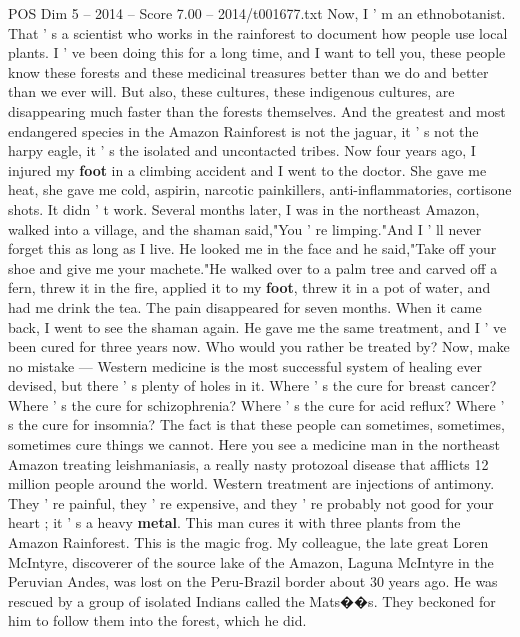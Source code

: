 \begin{textsample}{POS Dim 5 – 2014 – Score 7.00 – 2014/t001677.txt}  \label{ex:f5_pos_043}
Now, I ' m an ethnobotanist.
That ' s a scientist who works in the rainforest to document how people use local plants.
I ' ve been doing this for a long time, and I want to tell you, these people know these forests and these medicinal treasures better than we do and better than we ever will.
But also, these cultures, these indigenous cultures, are disappearing much faster than the forests themselves.
And the greatest and most endangered species in the Amazon Rainforest is not the jaguar, it ' s not the harpy eagle, it ' s the isolated and uncontacted tribes.
Now four years ago, I injured my \textbf{foot} in a climbing accident and I went to the doctor.
She gave me heat, she gave me cold, aspirin, narcotic painkillers, anti-inflammatories, cortisone shots.
It didn ' t work.
Several months later, I was in the northeast Amazon, walked into a village, and the shaman said,"You ' re limping."And I ' ll never forget this as long as I live.
He looked me in the face and he said,"Take off your shoe and give me your machete."He walked over to a palm tree and carved off a fern, threw it in the fire, applied it to my \textbf{foot}, threw it in a pot of water, and had me drink the tea.
The pain disappeared for seven months.
When it came back, I went to see the shaman again.
He gave me the same treatment, and I ' ve been cured for three years now.
Who would you rather be treated by?
Now, make no mistake — Western medicine is the most successful system of healing ever devised, but there ' s plenty of holes in it.
Where ' s the cure for breast cancer?
Where ' s the cure for schizophrenia?
Where ' s the cure for acid reflux?
Where ' s the cure for insomnia?
The fact is that these people can sometimes, sometimes, sometimes cure things we cannot.
Here you see a medicine man in the northeast Amazon treating leishmaniasis, a really nasty protozoal disease that afflicts 12 million people around the world.
Western treatment are injections of antimony.
They ' re painful, they ' re expensive, and they ' re probably not good for your heart ; it ' s a heavy \textbf{metal}.
This man cures it with three plants from the Amazon Rainforest.
This is the magic frog.
My colleague, the late great Loren McIntyre, discoverer of the source lake of the Amazon, Laguna McIntyre in the Peruvian Andes, was lost on the Peru-Brazil border about 30 years ago.
He was rescued by a group of isolated Indians called the Mats{\EmojiFont �}{\EmojiFont �}s.
They beckoned for him to follow them into the forest, which he did.

\end{textsample}
